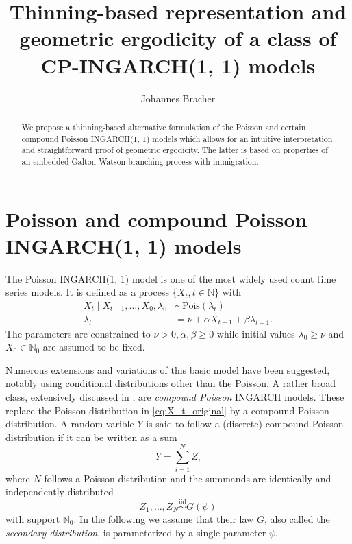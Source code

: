 \documentclass[10pt,a4paper]{article}
\begin{document}
\title{Thinning-based representation and geometric ergodicity of a class of CP-INGARCH(1, 1) models}
\author{Johannes Bracher}

\maketitle

\newcommand{\juv}{J}

\begin{abstract}
We propose a thinning-based alternative formulation of the Poisson and certain compound Poisson INGARCH(1, 1) models which allows for an intuitive interpretation and straightforward proof of geometric ergodicity. The latter is based on properties of an embedded Galton-Watson branching process with immigration.
\end{abstract}

\section{Poisson and compound Poisson INGARCH(1, 1) models}
\label{sec:alternative_formulation}

The Poisson INGARCH(1, 1) model \cite{Ferland2006, Fokianos2009} is one of the most widely used count time series models. It is defined as a process $\{X_t, t \in \mathbb{N}\}$ with
\begin{align}
X_t \mid X_{t - 1}, \dots, X_0, \lambda_0 & \sim \text{Pois}(\lambda_t)\label{eq:X_t_original}\\
\lambda_t & = \nu + \alpha X_{t - 1} + \beta \lambda_{t - 1}. \label{eq:lambda_t}
\end{align}
The parameters are constrained to $\nu > 0, \alpha, \beta \geq 0$ while initial values $\lambda_0 \geq \nu$ and $X_0 \in \mathbb{N}_0$ are assumed to be fixed.

Numerous extensions and variations of this basic model have been suggested, notably using conditional distributions other than the Poisson. A rather broad class, extensively discussed in \cite{Goncalves2015}, are \textit{compound Poisson} INGARCH models. These replace the Poisson distribution in \eqref{eq:X_t_original} by a compound Poisson distribution. A random varible $Y$ is said to follow a (discrete) compound Poisson distribution \cite[Chapter 3]{Feller1968} if it can be written as a sum 
$$
Y = \sum_{i = 1}^N Z_i
$$
where $N$ follows a Poisson distribution and the summands are identically and independently distributed
$$
Z_1, \dots, Z_N \stackrel{\text{iid}}{\sim} G(\psi)
$$
with support $\mathbb{N}_0$. In the following we assume that their law $G$, also called the \textit{secondary distribution}, is parameterized by a single parameter $\psi$.
\end{document}
